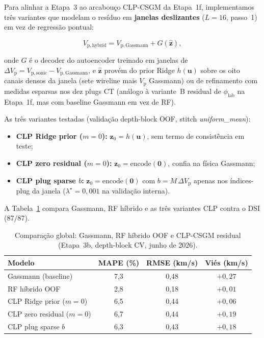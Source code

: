 \documentclass[11pt,a4paper]{article}
\numberwithin{equation}{section}
\newcommand{\Vp}{\ensuremath{V_{\mathrm{p}}}}
\newcommand{\philab}{\ensuremath{\phi_{\mathrm{lab}}}}
\begin{document}
Para alinhar a Etapa~3 ao arcabouço CLP-CSGM da Etapa~1f, implementamos
três variantes que modelam o resíduo em \textbf{janelas deslizantes}
($L=16$, passo~1) em vez de regressão pontual:

\begin{equation}
  V_{\mathrm{p,hybrid}} = V_{\mathrm{p,Gassmann}} + G(\hat{\mathbf{z}}),
  \label{eq:clp_vp_hybrid}
\end{equation}

onde $G$ é o decoder do autoencoder treinado em janelas de
$\Delta V_{\mathrm{p}} = V_{\mathrm{p,sonic}} - V_{\mathrm{p,Gassmann}}$,
e $\hat{\mathbf{z}}$ provém do prior Ridge $h(\mathbf{u})$ sobre os oito
canais densos da janela (sete wireline mais \Vp{} Gassmann) ou de
refinamento com medidas esparsas nos dez plugs CT (análogo à variante~B
residual de \philab{} na Etapa~1f, mas com baseline Gassmann em vez de RF).

As três variantes testadas (validação depth-block OOF, stitch
\emph{uniform\_mean}):

\begin{itemize}
  \item \textbf{CLP Ridge prior ($m{=}0$):}
        $\mathbf{z}_0 = h(\mathbf{u})$, sem termo de consistência em teste;
  \item \textbf{CLP zero residual ($m{=}0$):}
        $\mathbf{z}_0 = \mathrm{encode}(\mathbf{0})$, confia na física Gassmann;
  \item \textbf{CLP plug sparse $b$:}
        $\mathbf{z}_0 = \mathrm{encode}(\mathbf{0})$ com
        $b = M\,\Delta V_{\mathrm{p}}$ apenas nos índices-plug da janela
        ($\lambda^\star = 0{,}001$ na validação interna).
\end{itemize}

A Tabela~\ref{tab:clp_compare_global} compara Gassmann, RF híbrido e as
três variantes CLP contra o DSI (87/87).

\begin{table}[H]
  \centering
  \caption{Comparação global: Gassmann, RF híbrido OOF e CLP-CSGM residual
           (Etapa~3b, depth-block CV, junho de 2026).}
  \label{tab:clp_compare_global}
  \begin{tabular}{lccc}
    \toprule
    Modelo & MAPE (\%) & RMSE (km/s) & Viés (km/s) \\
    \midrule
    Gassmann (baseline) & 7,3 & 0,48 & $+0{,}27$ \\
    RF híbrido OOF & 2,8 & 0,18 & $+0{,}01$ \\
    CLP Ridge prior ($m{=}0$) & 6,5 & 0,44 & $+0{,}06$ \\
    CLP zero residual ($m{=}0$) & 6,7 & 0,44 & $+0{,}19$ \\
    CLP plug sparse $b$ & 6,3 & 0,43 & $+0{,}18$ \\
    \bottomrule
  \end{tabular}
\end{table}
\end{document}
